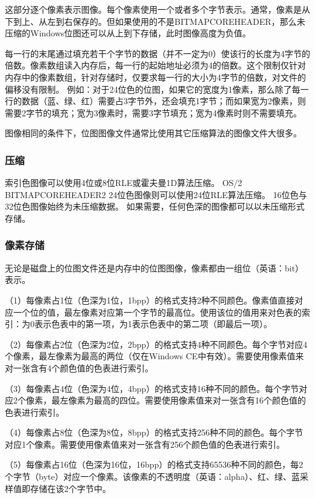 \documentclass[UTF8]{ctexart}
\begin{document}
这部分逐个像素表示图像。每个像素使用一个或者多个字节表示。通常，像素是从下到上、从左到右保存的。但如果使用的不是BITMAPCOREHEADER，那么未压缩的Windows位图还可以从上到下存储，此时图像高度为负值。

每一行的末尾通过填充若干个字节的数据（并不一定为0）使该行的长度为4字节的倍数。像素数组读入内存后，每一行的起始地址必须为4的倍数。这个限制仅针对内存中的像素数组，针对存储时，仅要求每一行的大小为4字节的倍数，对文件的偏移没有限制。
例如：对于24位色的位图，如果它的宽度为1像素，那么除了每一行的数据（蓝、绿、红）需要占3字节外，还会填充1字节；而如果宽为2像素，则需要2字节的填充；宽为3像素时，需要3字节填充；宽为4像素时则不需要填充。

图像相同的条件下，位图图像文件通常比使用其它压缩算法的图像文件大很多。

\subsubsection{压缩}

索引色图像可以使用4位或8位RLE或霍夫曼1D算法压缩。
OS/2 BITMAPCOREHEADER2 24位色图像则可以使用24位RLE算法压缩。
16位色与32位色图像始终为未压缩数据。
如果需要，任何色深的图像都可以以未压缩形式存储。

\subsubsection{像素存储}

无论是磁盘上的位图文件还是内存中的位图图像，像素都由一组位（英语：bit）表示。

（1）每像素占1位（色深为1位，1bpp）的格式支持2种不同颜色。像素值直接对应一个位的值，最左像素对应第一个字节的最高位。使用该位的值用来对色表的索引：为0表示色表中的第一项，为1表示色表中的第二项（即最后一项）。

（2）每像素占2位（色深为2位，2bpp）的格式支持4种不同颜色。每个字节对应4个像素，最左像素为最高的两位（仅在Windows CE中有效）。需要使用像素值来对一张含有4个颜色值的色表进行索引。

（3）每像素占4位（色深为4位，4bpp）的格式支持16种不同的颜色。每个字节对应2个像素，最左像素为最高的四位。需要使用像素值来对一张含有16个颜色值的色表进行索引。

（4）每像素占8位（色深为8位，8bpp）的格式支持256种不同的颜色。每个字节对应1个像素。需要使用像素值来对一张含有256个颜色值的色表进行索引。

（5）每像素占16位（色深为16位，16bpp）的格式支持65536种不同的颜色，每2个字节（byte）对应一个像素。该像素的不透明度（英语：alpha）、红、绿、蓝采样值即存储在该2个字节中。
\end{document}
